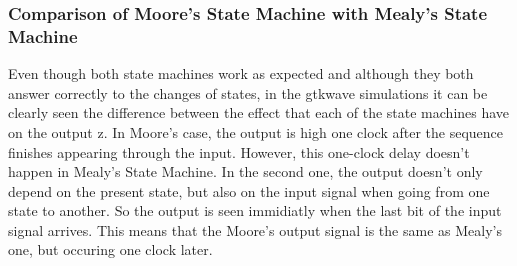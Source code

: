 \subsubsection{\color{orange}Comparison of Moore's State Machine with Mealy's State Machine}
Even though both state machines work as expected and although they both answer correctly to the changes of states, in the gtkwave simulations it can be clearly seen the difference between the effect that each of the state machines have on the output z. In Moore's case, the output is high one clock after the sequence finishes appearing through the input. However, this one-clock delay doesn't happen in Mealy's State Machine. In the second one, the output doesn't only depend on the present state, but also on the input signal when going from one state to another. So the output is seen immidiatly when the last bit of the input signal arrives. This means that the Moore's output signal is the same as Mealy's one, but occuring one clock later.
